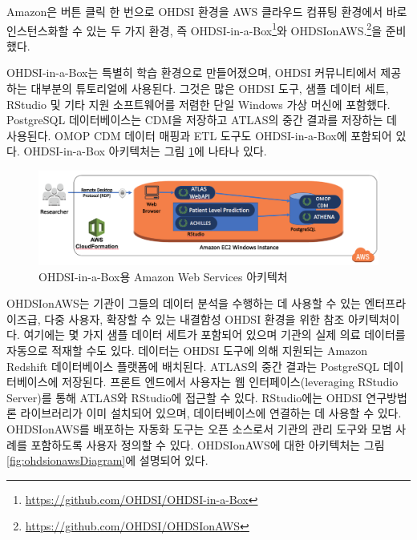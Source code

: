 \documentclass[10.5pt]{book}
\let\rmarkdownfootnote\footnote%
\def\footnote{\protect\rmarkdownfootnote}
\theoremstyle{definition}
\theoremstyle{definition}
\theoremstyle{definition}
\theoremstyle{remark}
\begin{document}
Amazon은 버튼 클릭 한 번으로 OHDSI 환경을 AWS 클라우드 컴퓨팅 환경에서
바로 인스턴스화할 수 있는 두 가지 환경, 즉 OHDSI-in-a-Box\footnote{\url{https://github.com/OHDSI/OHDSI-in-a-Box}}와
OHDSIonAWS.\footnote{\url{https://github.com/OHDSI/OHDSIonAWS}}을
준비했다. 

OHDSI-in-a-Box는 특별히 학습 환경으로 만들어졌으며, OHDSI 커뮤니티에서
제공하는 대부분의 튜토리얼에 사용된다. 그것은 많은 OHDSI 도구, 샘플
데이터 세트, RStudio 및 기타 지원 소프트웨어를 저렴한 단일 Windows 가상
머신에 포함했다. PostgreSQL 데이터베이스는 CDM을 저장하고 ATLAS의 중간
결과를 저장하는 데 사용된다. OMOP CDM 데이터 매핑과 ETL 도구도
OHDSI-in-a-Box에 포함되어 있다. OHDSI-in-a-Box 아키텍처는 그림
\ref{fig:ohdsiinaboxDiagram}에 나타나 있다.

\begin{figure}

{\centering \includegraphics[width=1\linewidth]{images/OhdsiAnalyticsTools/OHDSI-in-a-BoxDiagram} 

}

\caption{OHDSI-in-a-Box용 Amazon Web Services 아키텍처}\label{fig:ohdsiinaboxDiagram}
\end{figure}

OHDSIonAWS는 기관이 그들의 데이터 분석을 수행하는 데 사용할 수 있는
엔터프라이즈급, 다중 사용자, 확장할 수 있는 내결함성 OHDSI 환경을 위한
참조 아키텍처이다. 여기에는 몇 가지 샘플 데이터 세트가 포함되어 있으며
기관의 실제 의료 데이터를 자동으로 적재할 수도 있다. 데이터는 OHDSI
도구에 의해 지원되는 Amazon Redshift 데이터베이스 플랫폼에 배치된다.
ATLAS의 중간 결과는 PostgreSQL 데이터베이스에 저장된다. 프론트 엔드에서
사용자는 웹 인터페이스(leveraging RStudio Server)를 통해 ATLAS와
RStudio에 접근할 수 있다. RStudio에는 OHDSI 연구방법론 라이브러리가 이미
설치되어 있으며, 데이터베이스에 연결하는 데 사용할 수 있다. OHDSIonAWS를
배포하는 자동화 도구는 오픈 소스로서 기관의 관리 도구와 모범 사례를
포함하도록 사용자 정의할 수 있다. OHDSIonAWS에 대한 아키텍처는 그림
\ref{fig:ohdsionawsDiagram}에 설명되어 있다.
\end{document}
